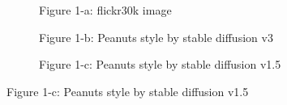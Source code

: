\documentclass{article}
\begin{document}
\begin{enumerate}
\begin{figure}[h!]
		\begin{subfigure}[t]{0.3\textwidth} %
			\centering
			\caption{Figure 1-a: flickr30k image}
		\end{subfigure}
		\begin{subfigure}[t]{0.3\textwidth}
			\centering
			\caption{Figure 1-b: Peanuts style by stable diffusion v3}
		\end{subfigure}
		\begin{subfigure}[t]{0.3\textwidth}
			\centering
			\caption{Figure 1-c: Peanuts style by stable diffusion v1.5}
		\end{subfigure}
	\end{figure}

\end{enumerate}
\end{document}
